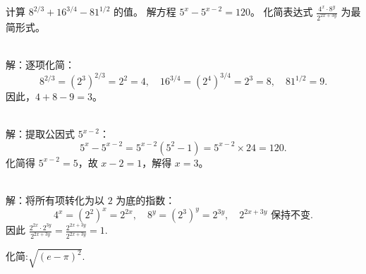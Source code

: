\documentclass{ctexart}
\newenvironment{MyAnswer}[1][] %
{
    \begin{tcolorbox}[breakable, colframe=blue]
    \begin{Answer}[#1] \color{blue} \kaishu
        }  %
    {\end{Answer}
\end{tcolorbox}
}
\begin{document}
\begin{Exercise}[title={指数运算小练习2}, label={ex:exponent2}]
    \Question 计算 $8^{2/3} + 16^{3/4} - 81^{1/2}$ 的值。
    \Question 解方程 $5^{x} - 5^{x-2} = 120$。
    \Question 化简表达式 $\frac{4^{x} \cdot 8^{y}}{2^{2x + 3y}}$ 为最简形式。
\end{Exercise}


\begin{MyAnswer}[ref={ex:exponent2}]
    \Question {}\\ 
    解：逐项化简：
    $$
    8^{2/3} = (2^3)^{2/3} = 2^2 = 4, \quad 
    16^{3/4} = (2^4)^{3/4} = 2^3 = 8, \quad 
    81^{1/2} = 9.
    $$
    因此，$4 + 8 - 9 = 3$。  
 
    \Question {}\\ 
    解：提取公因式 $5^{x-2}$：
    $$
    5^{x} - 5^{x-2} = 5^{x-2}(5^2 - 1) = 5^{x-2} \times 24 = 120.
    $$
    化简得 $5^{x-2} = 5$，故 $x - 2 = 1$，解得 $x = 3$。

    \Question {}\\ 
    解：将所有项转化为以 $2$ 为底的指数：
    $$
    4^x = (2^2)^x = 2^{2x}, \quad 8^y = (2^3)^y = 2^{3y}, \quad 2^{2x + 3y} \text{ 保持不变}.
    $$
    因此
    $
    \frac{2^{2x} \cdot 2^{3y}}{2^{2x + 3y}} = \frac{2^{2x + 3y}}{2^{2x + 3y}} = 1.
    $ %
\end{MyAnswer}


\begin{Exercise}[title={指数运算小练习3}, label={ex:exponent3}]
    \Question  化简:$\sqrt{(e - \pi)^2}$.
\end{Exercise}



\begin{MyAnswer}[ref={ex:exponent3}]
    \Question {}\\ 


\end{MyAnswer}
\clearpage
\end{document}

